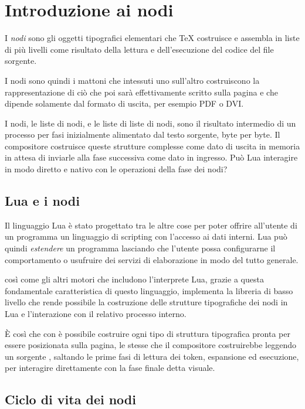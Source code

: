 

\chapter{Introduzione ai nodi}
\label{iiiChNodi}

I \emph{nodi} sono gli oggetti tipografici elementari che \TeX{} costruisce e
assembla in liste di più livelli come risultato della lettura e dell'esecuzione
del codice del file sorgente.

I nodi sono quindi i mattoni che intessuti uno sull'altro costruiscono la
rappresentazione di ciò che poi sarà effettivamente scritto sulla pagina e che
dipende solamente dal formato di uscita, per esempio PDF o DVI.

I nodi, le liste di nodi, e le liste di liste di nodi, sono il risultato
intermedio di un processo per fasi inizialmente alimentato dal testo sorgente,
byte per byte. Il compositore costruisce queste strutture complesse come dato di
uscita in memoria in attesa di inviarle alla fase successiva come dato in
ingresso. Può Lua interagire in modo diretto e nativo con le operazioni della
fase dei nodi?


\section{Lua e i nodi}

Il linguaggio Lua è stato progettato tra le altre cose per poter offrire
all'utente di un programma un linguaggio di scripting con l'accesso ai dati
interni. Lua può quindi \emph{estendere} un programma lasciando che l'utente
possa configurarne il comportamento o usufruire dei servizi di elaborazione in
modo del tutto generale.

\LuaTeX{} così come gli altri motori che includono l'interprete Lua, grazie a
questa fondamentale caratteristica di questo linguaggio, implementa la libreria
di basso livello  che rende possibile la costruzione delle strutture
tipografiche dei nodi in Lua e l'interazione con il relativo processo interno.

È così che con  è possibile costruire ogni tipo di struttura
tipografica pronta per essere posizionata sulla pagina, le stesse che il
compositore costruirebbe leggendo un sorgente , saltando le prime
fasi di lettura dei token, espansione ed esecuzione, per interagire direttamente
con la fase finale detta visuale.


\section{Ciclo di vita dei nodi}
\label{iiiSecCicloVitaNodi}

